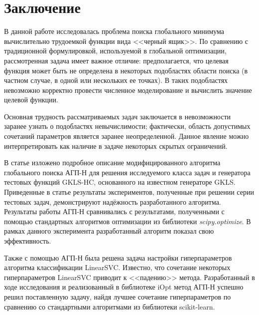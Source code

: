 \documentclass[a4paper,12pt,russian]{article}
\begin{document}
\section{Заключение}

В данной работе исследовалась проблема поиска глобального минимума вычислительно трудоемкой функции вида <<черный ящик>>. По сравнению с традиционной формулировкой, используемой в глобальной оптимизации, рассмотренная задача имеет важное отличие: предполагается, что целевая функция может быть не определена в некоторых подобластях области поиска (в частном случае, в одной или нескольких ее точках). В таких подобластях невозможно корректно провести численное моделирование и вычислить значение целевой функции.

Основная трудность рассматриваемых задач заключается в невозможности заранее узнать о подобластях невычислимости; фактически, область допустимых сочетаний параметров является заранее неопределенной. Данное явление можно интерпретировать как наличие в задаче некоторых скрытых ограничений.

В статье изложено подробное описание модифицированного алгоритма глобального поиска АГП-Н для решения исследуемого класса задач и генератора тестовых функций GKLS-HC, основанного на известном генераторе GKLS. Приведенные в статье результаты экспериментов, полученные при решении серии тестовых задач, демонстрируют надёжность разработанного алгоритма. Результаты работы АГП-Н сравнивались с результатами, полученными с помощью стандартных алгоритмов оптимизации из библиотеки \textit{scipy.optimize}. В рамках данного эксперимента разработанный алгоритм показал свою эффективность.

Также с помощью АГП-Н была решена задача настройки гиперпараметров алгоритма классификации LinearSVC. Известно, что сочетание некоторых гиперпараметров LinearSVC приводит к <<падению>> метода. Разработанный в ходе исследования и реализованный в библиотеке iOpt метод АГП-Н успешно решил поставленную задачу, найдя лучшее сочетание гиперпараметров по сравнению со стандартными алгоритмами из библиотеки scikit-learn.

\end{document}
